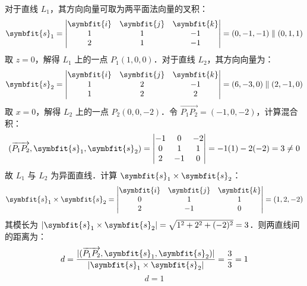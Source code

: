 \begin{solution}
    对于直线 $L_1$，其方向向量可取为两平面法向量的叉积：
    \begin{equation}
        \symbfit{s}_1 = \begin{vmatrix} \symbfit{i} & \symbfit{j} & \symbfit{k} \\ 1 & 1 & -1 \\ 2 & 1 & -1 \end{vmatrix} = (0, -1, -1) \parallel (0, 1, 1)
    \end{equation}
    取 $z = 0$，解得 $L_1$ 上的一点 $P_1(1, 0, 0)$．对于直线 $L_2$，其方向向量为：
    \begin{equation}
        \symbfit{s}_2 = \begin{vmatrix} \symbfit{i} & \symbfit{j} & \symbfit{k} \\ 1 & 2 & -1 \\ 1 & 2 & 2 \end{vmatrix} = (6, -3, 0) \parallel (2, -1, 0)
    \end{equation}
    取 $x = 0$，解得 $L_2$ 上的一点 $P_2(0, 0, -2)$．令 $\overrightarrow{P_1P_2} = (-1, 0, -2)$，计算混合积：
    \begin{equation}
        (\overrightarrow{P_1P_2}, \symbfit{s}_1, \symbfit{s}_2) = \begin{vmatrix} -1 & 0 & -2 \\ 0 & 1 & 1 \\ 2 & -1 & 0 \end{vmatrix} = -1(1) - 2(-2) = 3 \neq 0
    \end{equation}
    故 $L_1$ 与 $L_2$ 为异面直线．计算 $\symbfit{s}_1 \times \symbfit{s}_2$：
    \begin{equation}
        \symbfit{s}_1 \times \symbfit{s}_2 = \begin{vmatrix} \symbfit{i} & \symbfit{j} & \symbfit{k} \\ 0 & 1 & 1 \\ 2 & -1 & 0 \end{vmatrix} = (1, 2, -2)
    \end{equation}
    其模长为 $|\symbfit{s}_1 \times \symbfit{s}_2| = \sqrt{1^2 + 2^2 + (-2)^2} = 3$．则两直线间的距离为：
    \begin{equation}
        d = \frac{|(\overrightarrow{P_1P_2}, \symbfit{s}_1, \symbfit{s}_2)|}{|\symbfit{s}_1 \times \symbfit{s}_2|} = \frac{3}{3} = 1
    \end{equation}
    \begin{equation}
        \boxed{d = 1}
    \end{equation}
\end{solution}


